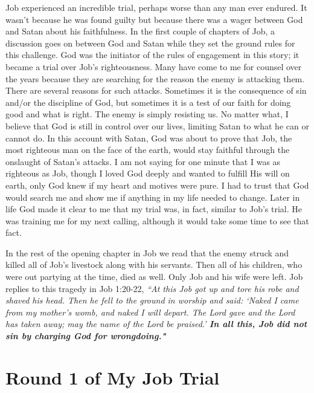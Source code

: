 \documentclass[oneside]{book}
\begin{document}
Job experienced an incredible trial, perhaps worse than any man ever endured. It wasn't because he was found guilty but because there was a wager between God and Satan about his faithfulness. In the first couple of chapters of Job, a discussion goes on between God and Satan while they set the ground rules for this challenge. God was the initiator of the rules of engagement in this story; it became a trial over Job's righteousness. Many have come to me for counsel over the years because they are searching for the reason the enemy is attacking them. There are several reasons for such attacks. Sometimes it is the consequence of sin and/or the discipline of God, but sometimes it is a test of our faith for doing good and what is right. The enemy is simply resisting us. No matter what, I believe that God is still in control over our lives, limiting Satan to what he can or cannot do. In this account with Satan, God was about to prove that Job, the most righteous man on the face of the earth, would stay faithful through the onslaught of Satan's attacks. I am not saying for one minute that I was as righteous as Job, though I loved God deeply and wanted to fulfill His will on earth, only God knew if my heart and motives were pure. I had to trust that God would search me and show me if anything in my life needed to change. Later in life God made it clear to me that my trial was, in fact, similar to Job's trial. He was training me for my next calling, although it would take some time to see that fact.

In the rest of the opening chapter in Job we read that the enemy struck and killed all of Job's livestock along with his servants. Then all of his children, who were out partying at the time, died as well. Only Job and his wife were left. Job replies to this tragedy in Job 1:20-22, \textit{``At this Job got up and tore his robe and shaved his head. Then he fell to the ground in worship and said: `Naked I came from my mother's womb, and naked I will depart. The Lord gave and the Lord has taken away; may the name of the Lord be praised.' \textbf{In all this, Job did not sin by charging God for wrongdoing."}}


\section{Round 1 of My Job Trial}
\
\end{document}
